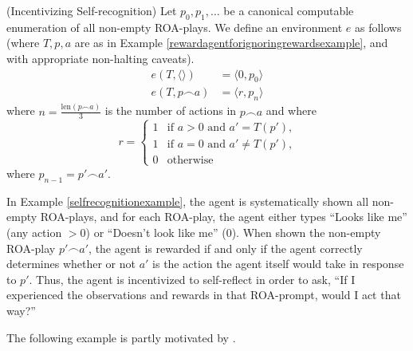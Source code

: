 \documentclass[runningheads]{llncs}
\begin{document}
\begin{example}
\label{selfrecognitionexample}
    (Incentivizing Self-recognition)
    Let $p_0,p_1,\ldots$ be a canonical computable enumeration of all non-empty ROA-plays.
    We define an environment $e$ as follows (where $T,p,a$
    are as in Example \ref{rewardagentforignoringrewardsexample}, and with appropriate
    non-halting caveats).
    \begin{align*}
        e(T,\langle\rangle) &= \langle 0, p_0\rangle\\
        e(T,p\frown a) &= \langle r, p_{n}\rangle
    \end{align*}
    where $n=\frac{\mbox{len}(p\frown a)}{3}$ is the number of actions in $p\frown a$ and where
    \[
        r =
        \begin{cases}
            1 &\mbox{if $a>0$ and $a'=T(p')$,}\\
            1 &\mbox{if $a=0$ and $a'\not=T(p')$,}\\
            0 &\mbox{otherwise}
        \end{cases}
    \]
    where $p_{n-1}=p'\frown a'$.
\end{example}

In Example \ref{selfrecognitionexample}, the agent is systematically
shown all non-empty ROA-plays, and for
each ROA-play, the agent either types ``Looks like me'' (any action $>0$)
or ``Doesn't look like me'' ($0$). When shown the non-empty ROA-play
$p'\frown a'$, the agent is rewarded if and only if the agent
correctly determines whether or not $a'$
is the action the agent itself would take in response to $p'$.
Thus, the agent is incentivized to self-reflect in order to ask, ``If I experienced the
observations and rewards in that ROA-prompt, would I act that way?''

The following example is partly motivated by \cite{yampolskiy2012ai}.
\end{document}
